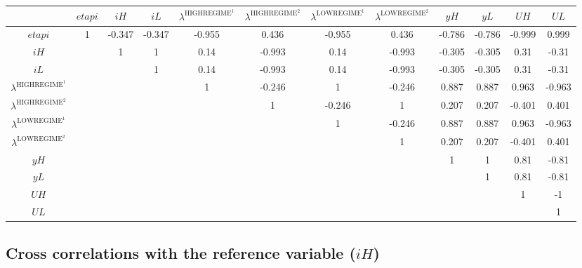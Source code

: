 \begin{tabular}{c|ccccccccccc|}
  & ${e\!t\!a\!p\!i}$ & ${i\!H}$ & ${i\!L}$ & $\lambda^{\mathrm{HIGHREGIME}^{\mathrm{1}}}$ & $\lambda^{\mathrm{HIGHREGIME}^{\mathrm{2}}}$ & $\lambda^{\mathrm{LOWREGIME}^{\mathrm{1}}}$ & $\lambda^{\mathrm{LOWREGIME}^{\mathrm{2}}}$ & ${y\!H}$ & ${y\!L}$ & ${U\!H}$ & ${U\!L}$\\
\hline
${e\!t\!a\!p\!i}$ & 1 & -0.347 & -0.347 & -0.955 & 0.436 & -0.955 & 0.436 & -0.786 & -0.786 & -0.999 & 0.999 \\
${i\!H}$ &  & 1 & 1 & 0.14 & -0.993 & 0.14 & -0.993 & -0.305 & -0.305 & 0.31 & -0.31 \\
${i\!L}$ &  &  & 1 & 0.14 & -0.993 & 0.14 & -0.993 & -0.305 & -0.305 & 0.31 & -0.31 \\
$\lambda^{\mathrm{HIGHREGIME}^{\mathrm{1}}}$ &  &  &  & 1 & -0.246 & 1 & -0.246 & 0.887 & 0.887 & 0.963 & -0.963 \\
$\lambda^{\mathrm{HIGHREGIME}^{\mathrm{2}}}$ &  &  &  &  & 1 & -0.246 & 1 & 0.207 & 0.207 & -0.401 & 0.401 \\
$\lambda^{\mathrm{LOWREGIME}^{\mathrm{1}}}$ &  &  &  &  &  & 1 & -0.246 & 0.887 & 0.887 & 0.963 & -0.963 \\
$\lambda^{\mathrm{LOWREGIME}^{\mathrm{2}}}$ &  &  &  &  &  &  & 1 & 0.207 & 0.207 & -0.401 & 0.401 \\
${y\!H}$ &  &  &  &  &  &  &  & 1 & 1 & 0.81 & -0.81 \\
${y\!L}$ &  &  &  &  &  &  &  &  & 1 & 0.81 & -0.81 \\
${U\!H}$ &  &  &  &  &  &  &  &  &  & 1 & -1 \\
${U\!L}$ &  &  &  &  &  &  &  &  &  &  & 1 \\
\hline
\end{tabular}


\subsection{Cross correlations with the reference variable (${i\!H}$)}

